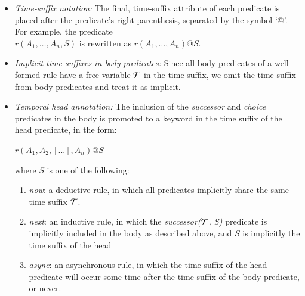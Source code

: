 \begin{itemize}
	\item {\em Time-suffix notation:}  The final, time-suffix attribute of each predicate is placed after the predicate's right parenthesis, separated by the symbol `@'.   For example, the predicate \\
	$r(A_{1}, \ldots, A_{n}, S)$ is rewritten as $r(A_{1}, \ldots, A_{n})@S$.
	\item {\em Implicit time-suffixes in body predicates:} Since all body predicates of a well-formed rule have a free variable $\Tau$ in the time suffix, we omit the time suffix from body predicates and treat it as implicit. 
	\item {\em Temporal head annotation:} The inclusion of the \emph{successor}
and \emph{choice} predicates in the body is promoted to a keyword in the time suffix of the head predicate, in the form:

$r(A_{1},A_{2},[...],A_{n})@S$

where $S$ is one of the following:
\begin{enumerate}
\item \emph{now}: a deductive rule, in which all predicates implicitly share the same time suffix $\Tau$.
\item \emph{next}: an inductive rule, in which the \emph{successor($\Tau$, S)} predicate is implicitly included in the body as described above, and $S$ is implicitly the time suffix of the head
\item \emph{async}: an asynchronous rule, in which the time suffix of the head predicate will occur some time after the time suffix of the body predicate, or never.
\end{enumerate}
\end{itemize}

% 
% 



